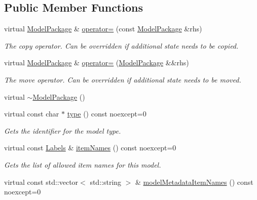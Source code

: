 \subsection*{Public Member Functions}
\begin{DoxyCompactItemize}
\item 
virtual \hyperlink{classdg_1_1deepcore_1_1classification_1_1_model_package}{Model\+Package} \& \hyperlink{group___classification_module_gac73fbbe8aca7bc1f27507c471939a0e7}{operator=} (const \hyperlink{classdg_1_1deepcore_1_1classification_1_1_model_package}{Model\+Package} \&rhs)
\begin{DoxyCompactList}\small\item\em The copy operator. Can be overridden if additional state needs to be copied. \end{DoxyCompactList}\item 
virtual \hyperlink{classdg_1_1deepcore_1_1classification_1_1_model_package}{Model\+Package} \& \hyperlink{group___classification_module_ga20bc12c1bba9457962b58f993a2106b4}{operator=} (\hyperlink{classdg_1_1deepcore_1_1classification_1_1_model_package}{Model\+Package} \&\&rhs)
\begin{DoxyCompactList}\small\item\em The move operator. Can be overridden if additional state needs to be moved. \end{DoxyCompactList}\item 
virtual \hyperlink{classdg_1_1deepcore_1_1classification_1_1_model_package_ad412100a44a69ffab9a37d236d5792ee}{$\sim$\+Model\+Package} ()
\item 
virtual const char $\ast$ \hyperlink{group___classification_module_ga9f09bd24a91c366c473b9fbb9a59b64a}{type} () const noexcept=0
\begin{DoxyCompactList}\small\item\em Gets the identifier for the model type. \end{DoxyCompactList}\item 
virtual const \hyperlink{group___classification_module_ga4c4d47162fed299b627f2e9d17381866}{Labels} \& \hyperlink{group___classification_module_gaa23ae021f838b2836c02dcc626bc1c8e}{item\+Names} () const noexcept=0
\begin{DoxyCompactList}\small\item\em Gets the list of allowed item names for this model. \end{DoxyCompactList}\item 
virtual const std\+::vector$<$ std\+::string $>$ \& \hyperlink{group___classification_module_ga634f0af2484a3c6de2e8c3a2ff6cea1d}{model\+Metadata\+Item\+Names} () const noexcept=0

\end{DoxyCompactItemize}
